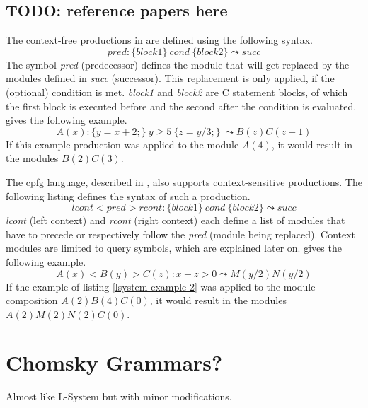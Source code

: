 \documentclass[11pt, a4paper]{report}
\begin{document}
\subsection{TODO: reference papers here}
The context-free productions in \citep{PrusinkiewiczEtAl:2001} are defined using the following syntax.
\begin{equation} \label{lsystem context free}
    pred : \{block1\}\ cond\ \{block2\} \leadsto succ
\end{equation}
The symbol \textit{pred} (predecessor) defines the module that will get replaced by the modules defined in \textit{succ} (successor). This replacement is only applied, if the (optional) condition is met. \textit{block1} and \textit{block2} are C statement blocks, of which the first block is executed before and the second after the condition is evaluated. \citep{PrusinkiewiczEtAl:2001} gives the following example.
\begin{equation} \label{lsystem example 1}
    A(x) : \{y = x + 2;\}\ y \geq 5\ \{z = y / 3;\}\ \leadsto B(z)C(z + 1)
\end{equation}
If this example production was applied to the module $A(4)$, it would result in the modules $B(2)C(3)$.

The cpfg language, described in \citep{PrusinkiewiczEtAl:2001}, also supports context-sensitive productions. The following listing defines the syntax of such a production.
\begin{equation} \label{lsystem context sensitive}
    lcont < pred > rcont : \{block1\}\ cond\ \{block2\} \leadsto succ
\end{equation}
\textit{lcont} (left context) and \textit{rcont} (right context) each define a list of modules that have to precede or respectively follow the \textit{pred} (module being replaced). Context modules are limited to query symbols, which are explained later on. \citep{PrusinkiewiczEtAl:2001} gives the following example.
\begin{equation} \label{lsystem example 2}
    A(x) < B(y) > C(z) : x + z > 0 \leadsto M(y / 2)N(y / 2)
\end{equation}
If the example of listing \ref{lsystem example 2} was applied to the module composition $A(2)B(4)C(0)$, it would result in the modules $A(2)M(2)N(2)C(0)$.

\pagebreak
\section{Chomsky Grammars?}
\citep{PrusinkiewiczEtAl:2001}
Almost like L-System but with minor modifications.
\end{document}
